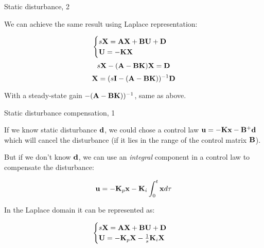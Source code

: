 \documentclass{beamer}
\begin{document}
\begin{frame}{Static disturbance, 2}
	\begin{flushleft}
		
		We can achieve the same result using Laplace representation:
		
		\begin{equation}
			\begin{cases}
				s \mathbf{X} = \mathbf{A} \mathbf{X} + \mathbf{B} \mathbf{U} + \mathbf{D} \\
				\mathbf{U} = -\mathbf{K}\mathbf{X}
			\end{cases}
		\end{equation}
		\begin{equation}
			s \mathbf{X} -( \mathbf{A} - \mathbf{B} \mathbf{K})\mathbf{X} = \mathbf{D}
		\end{equation}
		\begin{equation}
		\mathbf{X} =(s \mathbf{I} -( \mathbf{A} - \mathbf{B} \mathbf{K}))^{-1} \mathbf{D}
		\end{equation}
		
		With a steady-state gain $-( \mathbf{A} - \mathbf{B} \mathbf{K}))^{-1}$, same as above.
		
		
	\end{flushleft}
\end{frame}



\begin{frame}{Static disturbance compensation, 1}
	\begin{flushleft}
		
		If we know static disturbance $\mathbf{d}$, we could chose a control law $\mathbf{u} = -\mathbf{K}\mathbf{x} - \mathbf{B}^+\mathbf{d}$ which will cancel the disturbance (if it lies in the range of the control matrix $\mathbf{B}$).
		
		\bigskip
		
		But if we don't know $\mathbf{d}$, we can use an \emph{integral} component in a control law to compensate the disturbance:
		
		\begin{equation}
			\mathbf{u} = -\mathbf{K}_p\mathbf{x} -\mathbf{K}_i \int_{0}^{t} \mathbf{x} d \tau
		\end{equation}
		
		In the Laplace domain it can be represented as:
		
		
		\begin{equation}
			\begin{cases}
				s \mathbf{X} = \mathbf{A} \mathbf{X} + \mathbf{B} \mathbf{U} + \mathbf{D} \\
				\mathbf{U} = -\mathbf{K}_p\mathbf{X} -\frac{1}{s}\mathbf{K}_i \mathbf{X}
			\end{cases}
		\end{equation}
		
		
	\end{flushleft}
\end{frame}
\end{document}
